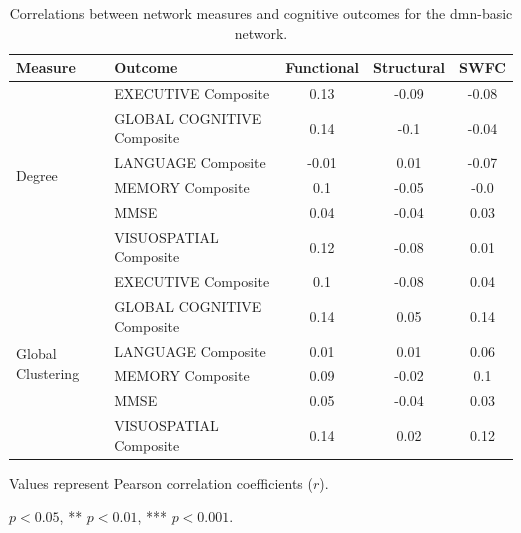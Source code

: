 
\begin{table}[htbp]
\centering
\begin{threeparttable}
\caption{Correlations between network measures and cognitive outcomes for the dmn-basic network.}
\small
\begin{tabular}{llccc}
\toprule
Measure & Outcome & Functional & Structural & SWFC \\
\midrule
\multirow{6}{*}{Degree} & EXECUTIVE Composite & 0.13 & -0.09 & -0.08 \\
& GLOBAL COGNITIVE Composite & 0.14 & -0.1 & -0.04 \\
& LANGUAGE Composite & -0.01 & 0.01 & -0.07 \\
& MEMORY Composite & 0.1 & -0.05 & -0.0 \\
& MMSE & 0.04 & -0.04 & 0.03 \\
& VISUOSPATIAL Composite & 0.12 & -0.08 & 0.01 \\
\midrule
\multirow{6}{*}{Global Clustering} & EXECUTIVE Composite & 0.1 & -0.08 & 0.04 \\
& GLOBAL COGNITIVE Composite & 0.14 & 0.05 & 0.14 \\
& LANGUAGE Composite & 0.01 & 0.01 & 0.06 \\
& MEMORY Composite & 0.09 & -0.02 & 0.1 \\
& MMSE & 0.05 & -0.04 & 0.03 \\
& VISUOSPATIAL Composite & 0.14 & 0.02 & 0.12 \\
\bottomrule
\end{tabular}
\begin{tablenotes}
\footnotesize
\item Values represent Pearson correlation coefficients ($r$).
\item * $p<0.05$, ** $p<0.01$, *** $p<0.001$.
\end{tablenotes}
\end{threeparttable}
\end{table}



